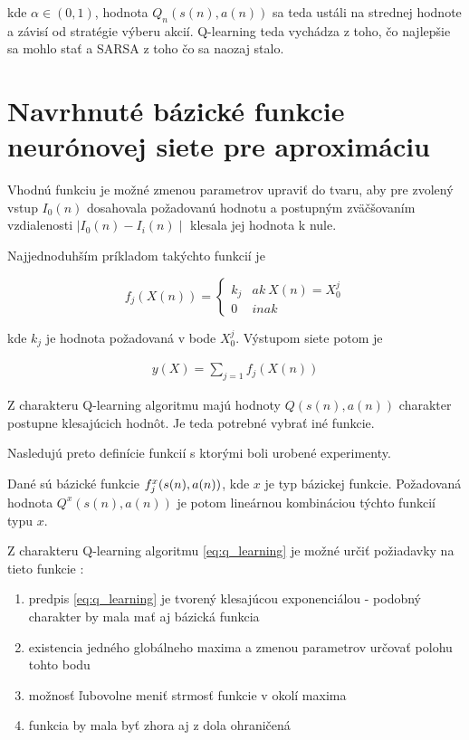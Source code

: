 kde $\alpha \in (0, 1)$, hodnota $Q_{n}(s(n),a(n))$ sa  teda ustáli na strednej hodnote
a závisí od stratégie výberu akcií. Q-learning teda vychádza z toho, čo najlepšie sa mohlo stať
a SARSA z toho čo sa naozaj stalo.


\chapter{Navrhnuté bázické funkcie neurónovej siete pre aproximáciu}

Vhodnú funkciu je možné zmenou parametrov upraviť do tvaru, aby pre zvolený
vstup $I_0(n)$ dosahovala požadovanú hodnotu a postupným zväčšovaním
vzdialenosti $\mid I_0(n) - I_i(n) \mid$ klesala jej hodnota k nule.

Najjednoduhším príkladom takýchto funkcií  je

\begin{equation}
f_j(X(n)) =
\left\{
	\begin{array}{ll}
		k_j  & ak \ X(n) = X^j_0 \\
		0 & inak
	\end{array}
\right.
\label{eq:bfnn_simple}
\end{equation}

kde $k_j$ je hodnota požadovaná v bode $X^j_0$. Výstupom siete potom je

\begin{align}
y(X) = \sum\limits_{j=1} f_j(X(n))
\label{eq:bfnn_simple_res}
\end{align}

Z charakteru Q-learning algoritmu majú hodnoty $Q(s(n),a(n))$ charakter
postupne klesajúcich hodnôt. Je teda potrebné vybrať iné funkcie.

Nasledujú preto definície funkcií s ktorými boli urobené experimenty.

Dané sú bázické funkcie $f_j^x(\boldmath{s(n), a(n)})$, kde $x$ je typ bázickej funkcie.
Požadovaná hodnota $Q^x(s(n), a(n))$ je potom lineárnou kombináciou týchto funkcií typu $x$.

Z charakteru Q-learning algoritmu \ref{eq:q_learning} je možné určiť požiadavky na
tieto funkcie :

\begin{enumerate}
\item predpis \ref{eq:q_learning} je tvorený klesajúcou exponenciálou - podobný charakter by mala mať aj bázická funkcia
\item existencia jedného globálneho maxima a zmenou parametrov určovať polohu tohto bodu
\item možnosť ľubovolne meniť strmosť funkcie v okolí maxima
\item funkcia by mala byť zhora aj z dola ohraničená
\end{enumerate}

